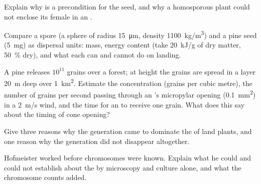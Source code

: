\begin{exercise}[$\star\star$]\label{exo:b2:plant-life-cycles:8}
Explain why  is a precondition for the seed, and why a
homosporous plant could not enclose its female  in an
.
\end{exercise}

\begin{exercise}[$\star\star$]\label{exo:b2:plant-life-cycles:9}
Compare a  spore (a sphere of radius \qty{15}{\micro m}, density
\qty{1100}{kg/m^3}) and a pine seed (\qty{5}{mg}) as dispersal
units: mass, energy content (take \qty{20}{kJ/g} of dry matter,
\qty{50}{\%} dry), and what each can and cannot do on landing.
\end{exercise}

\begin{exercise}[$\star\star\star$]\label{exo:b2:plant-life-cycles:10}
A pine releases $10^{11}$  grains over a forest; at 
height the grains are spread in a layer \qty{20}{m} deep over
\qty{1}{km^2}. Estimate the  concentration (grains per cubic
metre), the number of grains per second passing through an 's
micropylar opening (\qty{0.1}{mm^2}) in a \qty{2}{m/s} wind, and the
time for an  to receive one grain. What does this say about the
timing of cone opening?
\end{exercise}

\begin{exercise}[$\star\star\star$]\label{exo:b2:plant-life-cycles:11}
Give three reasons why the  generation came to dominate the
 of land plants, and one reason why the  generation
did not disappear altogether.
\end{exercise}

\begin{exercise}[$\star\star\star$]\label{exo:b2:plant-life-cycles:12}
Hofmeister worked before chromosomes were known. Explain what he
could and could not establish about the 
by microscopy and culture alone, and what the chromosome counts
added.
\end{exercise}

